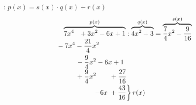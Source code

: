 \Bsp {}: $p(x) = s(x) \cdot q(x) + r(x)$
\begin{align*}
    &\overbrace{7x^4 \hspace{7pt} + 3x^2 - 6x + 1}^{p(x)} : \overbrace{4x^2 + 3}^{q(x)} = \overbrace{\frac{7}{4}x^2 - \frac{9}{16}}^{s(x)} \\[-0.6em]
    &\hspace{-9pt}-7x^4 - \frac{21}{4}x^2 \\
    &\hspace{19pt} -\frac{9}{4}x^2 - 6x + 1 \\[-0.3em]
    &\hspace{19pt} +\frac{9}{4}x^2 \hspace{19.5pt} + \frac{27}{16} \\[-0.2em]
    &\hspace{44pt} \left. -6x \hspace{2.5pt} + \frac{43}{16} \right\} r(x)
\end{align*}

